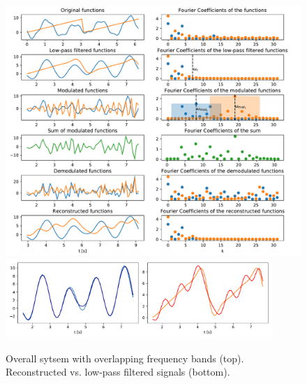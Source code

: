 \documentclass[12pt, a4paper]{report}
\begin{document}
\begin{figure}[h!]
	\centering
	\includegraphics[width=\textwidth]{figures/overall_overlapping.pdf}
	\includegraphics[width=0.9\textwidth]{figures/overlapping_cmp.pdf}
	\caption{Overall sytsem with overlapping frequency bands (top). Reconstructed vs. low-pass filtered signals (bottom).}
	\label{fig:overlap}
\end{figure}
\end{document}
